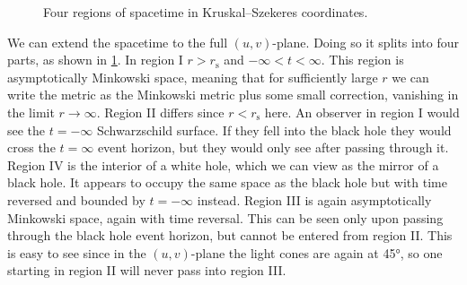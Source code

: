 \documentclass[fleqn]{NotesClass}
\begin{document}
    \begin{figure}
        \caption[Kruskal--Szekeres coordinates.]{Four regions of spacetime in Kruskal--Szekeres coordinates.}
        \label{fig:black hole kruskal szekeres coordinates}
    \end{figure}
    
    We can extend the spacetime to the full \((u, v)\)-plane.
    Doing so it splits into four parts, as shown in \cref{fig:black hole kruskal szekeres coordinates}.
    In region I \(r > r_{\mathrm{s}}\) and \(-\infty < t < \infty\).
    This region is asymptotically Minkowski space, meaning that for sufficiently large \(r\) we can write the metric as the Minkowski metric plus some small correction, vanishing in the limit \(r \to \infty\).
    Region II differs since \(r < r_{\mathrm{s}}\) here.
    An observer in region I would see the \(t = -\infty\) Schwarzschild surface.
    If they fell into the black hole they would cross the \(t = \infty\) event horizon, but they would only see after passing through it.
    Region IV is the interior of a white hole, which we can view as the mirror of a black hole.
    It appears to occupy the same space as the black hole but with time reversed and bounded by \(t = -\infty\) instead.
    Region III is again asymptotically Minkowski space, again with time reversal.
    This can be seen only upon passing through the black hole event horizon, but cannot be entered from region II.
    This is easy to see since in the \((u, v)\)-plane the light cones are again at \ang{45}, so one starting in region II will never pass into region III.
    
\end{document}

